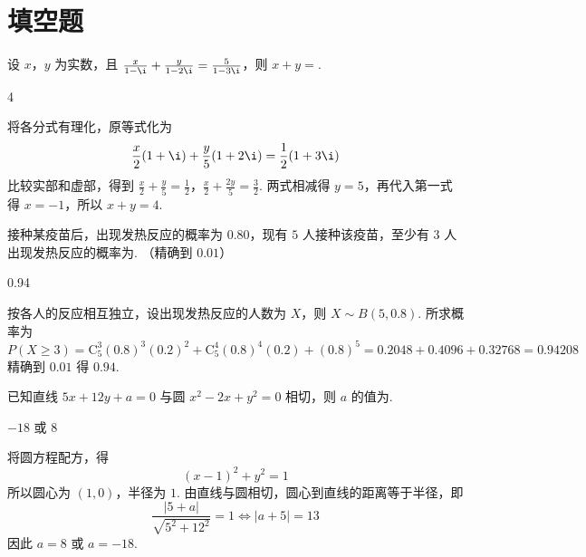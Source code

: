 \section{填空题}
\begin{problem}
设 \(x\)，\(y\) 为实数，且 \(\frac{x}{1 - \i} + \frac{y}{1 - 2\i} = \frac{5}{1 - 3\i}\)，则 \(x + y =\)\fillinblank{}.
\end{problem}

\begin{answer}
4
\end{answer}

\begin{solution}
将各分式有理化，原等式化为
\[
\frac{x}{2}(1+\i)+\frac{y}{5}(1+2\i)=\frac{1}{2}(1+3\i)
\]
比较实部和虚部，得到
\(\frac{x}{2}+\frac{y}{5}=\frac12\)，\(\frac{x}{2}+\frac{2y}{5}=\frac32\).
两式相减得 \(y=5\)，再代入第一式得 \(x=-1\)，所以 \(x+y=4\).
\end{solution}

\begin{problem}
接种某疫苗后，出现发热反应的概率为 \(0.80\)，现有 \(5\) 人接种该疫苗，至少有 \(3\) 人出现发热反应的概率为\fillinblank{}. （精确到 \(0.01\)）
\end{problem}

\begin{answer}
0.94
\end{answer}

\begin{solution}
按各人的反应相互独立，设出现发热反应的人数为 \(X\)，则 \(X\sim B(5,0.8)\). 所求概率为
\[
P(X\geqslant3)=\mathrm C_{5}^{3}(0.8)^{3}(0.2)^{2}+\mathrm C_{5}^{4}(0.8)^{4}(0.2)+(0.8)^{5}
=0.2048+0.4096+0.32768=0.94208
\]
精确到 \(0.01\) 得 \(0.94\).
\end{solution}

\begin{problem}
已知直线 \(5x + 12y + a = 0\) 与圆 \(x^{2} - 2x + y^{2} = 0\) 相切，则 \(a\) 的值为\fillinblank{}.
\end{problem}

\begin{answer}
\(-18\) 或 \(8\)
\end{answer}

\begin{solution}
将圆方程配方，得
\[
(x-1)^{2}+y^{2}=1
\]
所以圆心为 \((1,0)\)，半径为 \(1\). 由直线与圆相切，圆心到直线的距离等于半径，即
\[
\frac{|5+a|}{\sqrt{5^{2}+12^{2}}}=1\Longleftrightarrow |a+5|=13
\]
因此 \(a=8\) 或 \(a=-18\).
\end{solution}

